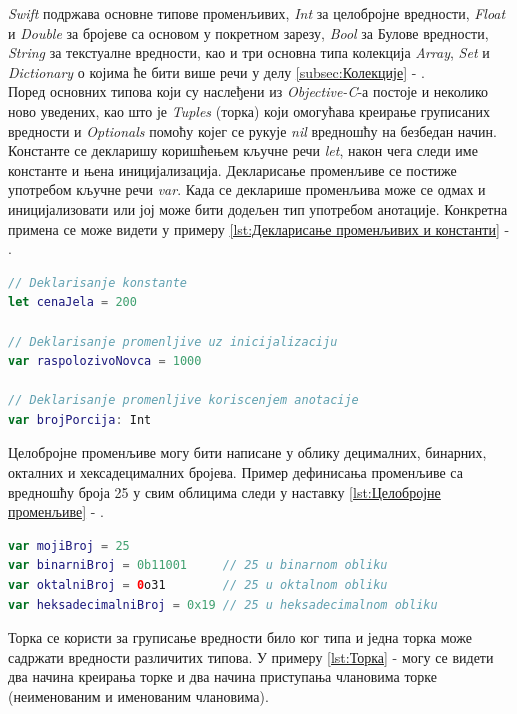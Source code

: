 \documentclass[12pt,oneside]{memoir}
\begin{document}
\indent \textit{Swift} подржава основне типове променљивих, \textit{Int} за целобројне вредности, \textit{Float} и \textit{Double} за бројеве са основом у покретном зарезу, \textit{Bool} за Булове вредности, \textit{String} за текстуалне вредности, као и три основна типа колекција \textit{Array}, \textit{Set} и \textit{Dictionary} о којима ће бити више речи у делу \ref{subsec:Колекције} - . 
\\ 
\indent Поред основних типова који су наслеђени из \textit{Objective-C}-а постоје и неколико ново уведених, као што је \textit{Tuples} (торка) који омогућава креирање груписаних вредности и \textit{Optionals} помоћу којег се рукује \textit{nil} вредношћу на безбедан начин.
\\
\indent Константе се декларишу коришћењем кључне речи \textit{let}, након чега следи име константе и њена иницијализација. Декларисање променљиве се постиже употребом кључне речи \textit{var}. Када се декларише променљива може се одмах и иницијализовати или јој може бити додељен тип употребом анотације. Конкретна примена се може видети у примеру \ref{lst:Декларисање променљивих и константи} - .

\begin{lstlisting}[caption=\textit{Декларисање променљивих и константи}, label={lst:Декларисање променљивих и константи}, language=Swift, frame=single]
// Deklarisanje konstante
let cenaJela = 200

// Deklarisanje promenljive uz inicijalizaciju
var raspolozivoNovca = 1000

// Deklarisanje promenljive koriscenjem anotacije
var brojPorcija: Int
\end{lstlisting}

\indent Целобројне променљиве могу бити написане у облику децималних, бинарних, окталних и хексадецималних бројева. Пример дефинисања променљиве са вредношћу броја 25 у свим облицима следи у наставку \ref{lst:Целобројне променљиве} - .

\begin{lstlisting}[caption=\textit{{Целобројне променљиве}}, label={lst:Целобројне променљиве}, language=Swift, frame=single]
var mojiBroj = 25 
var binarniBroj = 0b11001     // 25 u binarnom obliku
var oktalniBroj = 0o31        // 25 u oktalnom obliku
var heksadecimalniBroj = 0x19 // 25 u heksadecimalnom obliku
\end{lstlisting}

\indent Торка се користи за груписање вредности било ког типа и једна торка може садржати вредности различитих типова. У примеру \ref{lst:Торка} -  могу се видети два начина креирања торке и два начина приступања члановима торке (неименованим и именованим члановима).
\end{document}
